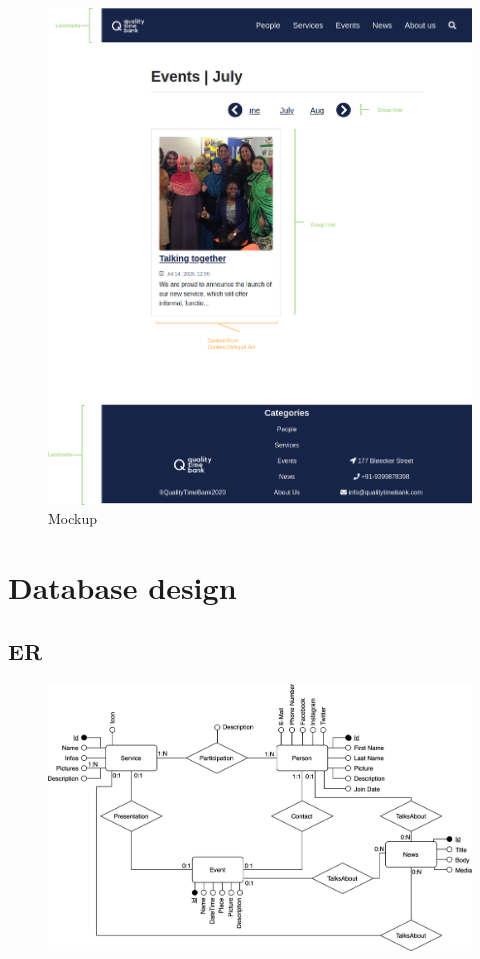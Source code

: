 \documentclass[a4paper, 11pt, parskip=half, headsepline]{scrreprt}
\begin{document}
\begin{figure}[H]
    \centering
    \includegraphics[width=1\linewidth, keepaspectratio]{mockups/ConcreteEventsJanuary}
    \caption{Mockup}
\end{figure}














\chapter{Database design}

\section{ER}

\begin{figure}[H]
    \centering
    \includegraphics[width=0.72\linewidth, keepaspectratio]{DB/ER}
\end{figure}
\end{document}
